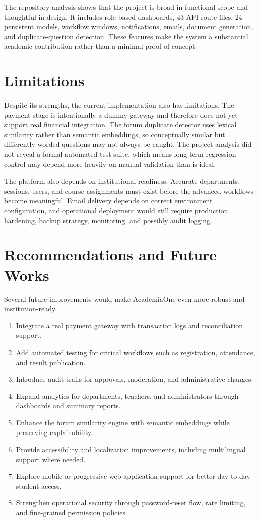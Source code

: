 \documentclass[12pt,a4paper]{report}
\newcommand{\systemName}{AcademiaOne}
\begin{document}
The repository analysis shows that the project is broad in functional scope and thoughtful in design. It includes role-based dashboards, 43 API route files, 24 persistent models, workflow windows, notifications, emails, document generation, and duplicate-question detection. These features make the system a substantial academic contribution rather than a minimal proof-of-concept.

\section{Limitations}
Despite its strengths, the current implementation also has limitations. The payment stage is intentionally a dummy gateway and therefore does not yet support real financial integration. The forum duplicate detector uses lexical similarity rather than semantic embeddings, so conceptually similar but differently worded questions may not always be caught. The project analysis did not reveal a formal automated test suite, which means long-term regression control may depend more heavily on manual validation than is ideal.

The platform also depends on institutional readiness. Accurate departments, sessions, users, and course assignments must exist before the advanced workflows become meaningful. Email delivery depends on correct environment configuration, and operational deployment would still require production hardening, backup strategy, monitoring, and possibly audit logging.

\section{Recommendations and Future Works}
Several future improvements would make \systemName{} even more robust and institution-ready.
\begin{enumerate}
  \item Integrate a real payment gateway with transaction logs and reconciliation support.
  \item Add automated testing for critical workflows such as registration, attendance, and result publication.
  \item Introduce audit trails for approvals, moderation, and administrative changes.
  \item Expand analytics for departments, teachers, and administrators through dashboards and summary reports.
  \item Enhance the forum similarity engine with semantic embeddings while preserving explainability.
  \item Provide accessibility and localization improvements, including multilingual support where needed.
  \item Explore mobile or progressive web application support for better day-to-day student access.
  \item Strengthen operational security through password-reset flow, rate limiting, and fine-grained permission policies.
\end{enumerate}
\end{document}

